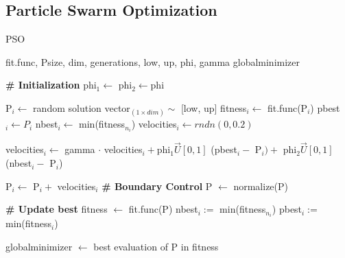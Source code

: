 \subsection{Particle Swarm Optimization}
\begin{algorithm}
	\singlespacing
	\caption{PSO} \label{PSO}
	\begin{algorithmic}[1]
		\INPUT fit.func, Psize, dim, generations, low, up, phi, gamma
		\OUTPUT globalminimizer
		
		\noindent \Statex \hrulefill
		\Statex \textbf{\# Initialization}
		\State phi$_1 \gets$ phi$_2 \gets $phi
		
		\State P$_i \gets $ random solution vector$_{(1 \times dim)} \sim$ [low, up] 
		\State fitness$_i \gets$ fit.func(P$_i$)
		\State pbest$_i \gets P_i$ 
		\State nbest$_i \gets$ min(fitness$_{n_i}$) 
		\State velocities$_i \gets rndn(0, 0.2)$
		\EndFor
		\Statex
		
		\State \parbox[t]{\dimexpr\linewidth-\algorithmicindent}{ velocities$_i \gets$ gamma $\cdot$ velocities$_i + $phi$_1 \vec{U}[0,1]$ (pbest$_i -$ P$_i) +$ phi$_2 \vec{U}[0,1]$ (nbest$_i -$ P$_i$)\strut} %
		\State P$_i \gets$ P$_i +$ velocities$_i$
		\EndFor
		\Statex \textbf{\# Boundary Control} 
		\State P $\gets$ normalize(P)
		
		\Statex \textbf{\# Update best}
		\State fitness $\gets$ fit.func(P)
		\State nbest$_i := $ min(fitness$_{n_i}$) \EndIf
		\State pbest$_i :=$ min(fitness$_i$) \EndIf
		
		\State globalminimizer $\gets$ best evaluation of P in fitness
		
		\EndFor
		
\end{algorithmic}
\end{algorithm}